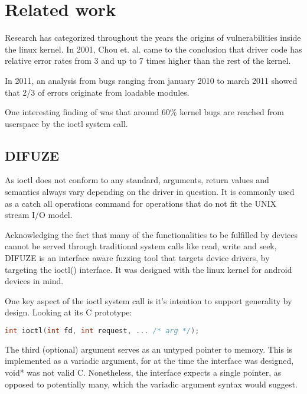 \section{Related work}


Research has categorized throughout the years the origins of
vulnerabilities inside the linux kernel. In 2001,  Chou et. al.
came to the conclusion that driver code has relative error rates
from 3 and up to 7 times higher than the rest of the kernel\cite{chouEmpiricalStudyOperating2001}.

In 2011, an analysis from bugs ranging from january 2010 to march 2011
showed that 2/3 of errors originate from loadable modules\cite{chenLinuxKernelVulnerabilities2011}.

One interesting finding of \cite{vanderstoepAndroidProtectingKernel2016} was that around 60\% kernel bugs
are reached from userspace by the ioctl system call.


\subsection{DIFUZE}

As ioctl does not conform to any standard, arguments, return values and semantics always vary
depending on the driver in question. It is commonly used as a catch all operations command for
operations that do not fit the UNIX stream I/O model.

Acknowledging the fact that many of the functionalities to be fulfilled
by devices cannot be served through traditional system calls like read, write
and seek, DIFUZE is an interface aware fuzzing tool that targets
device drivers, by targeting the ioctl() interface\cite{corinaDIFUZEInterfaceAware2017}.
It was designed with the linux kernel for android devices in mind.


One key aspect of the ioctl system call is it's intention to support generality by design.
Looking at its C prototype:

\begin{lstlisting}[language=c]
  int ioctl(int fd, int request, ... /* arg */);
\end{lstlisting}

The third (optional) argument serves as an untyped pointer to memory. This is implemented as a variadic argument, for at the time
the interface was designed, void* was not valid C. Nonetheless, the interface expects a single pointer, as opposed to potentially
many, which the variadic argument syntax would suggest.


